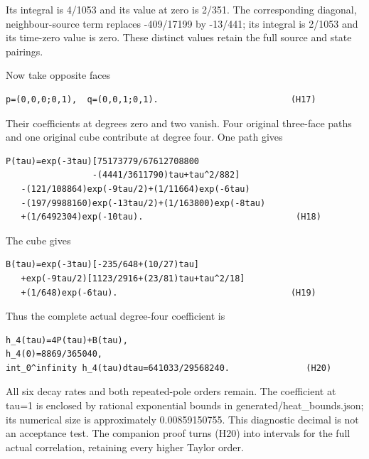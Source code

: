 \documentclass[11pt,a4paper]{article}
\renewcommand{\[}{\begingroup\small\originaldisplaystart}
\renewcommand{\]}{\originaldisplayend\endgroup}
\begin{document}
Its integral is 4/1053 and its value at zero is 2/351. The corresponding
diagonal, neighbour-source term replaces -409/17199 by -13/441; its
integral is 2/1053 and its time-zero value is zero. These distinct
values retain the full source and state pairings.

Now take opposite faces

\begin{verbatim}
p=(0,0,0;0,1),  q=(0,0,1;0,1).                          (H17)
\end{verbatim}

Their coefficients at degrees zero and two vanish. Four original
three-face paths and one original cube contribute at degree four. One
path gives

\begin{verbatim}
P(tau)=exp(-3tau)[75173779/67612708800
                 -(4441/3611790)tau+tau^2/882]
   -(121/108864)exp(-9tau/2)+(1/11664)exp(-6tau)
   -(197/9988160)exp(-13tau/2)+(1/163800)exp(-8tau)
   +(1/6492304)exp(-10tau).                              (H18)
\end{verbatim}

The cube gives

\begin{verbatim}
B(tau)=exp(-3tau)[-235/648+(10/27)tau]
   +exp(-9tau/2)[1123/2916+(23/81)tau+tau^2/18]
   +(1/648)exp(-6tau).                                  (H19)
\end{verbatim}

Thus the complete actual degree-four coefficient is

\begin{verbatim}
h_4(tau)=4P(tau)+B(tau),
h_4(0)=8869/365040,
int_0^infinity h_4(tau)dtau=641033/29568240.               (H20)
\end{verbatim}

All six decay rates and both repeated-pole orders remain. The
coefficient at tau=1 is enclosed by rational exponential bounds in
{g\allowbreak{}e\allowbreak{}n\allowbreak{}e\allowbreak{}r\allowbreak{}a\allowbreak{}t\allowbreak{}e\allowbreak{}d\allowbreak{}/\allowbreak{}h\allowbreak{}e\allowbreak{}a\allowbreak{}t\allowbreak{}\_\allowbreak{}b\allowbreak{}o\allowbreak{}u\allowbreak{}n\allowbreak{}d\allowbreak{}s\allowbreak{}.\allowbreak{}j\allowbreak{}s\allowbreak{}o\allowbreak{}n\allowbreak{};\allowbreak{}}
its numerical size is approximately 0.00859150755. This diagnostic
decimal is not an acceptance test. The companion proof turns (H20) into
intervals for the full actual correlation, retaining every higher Taylor
order.
\end{document}
